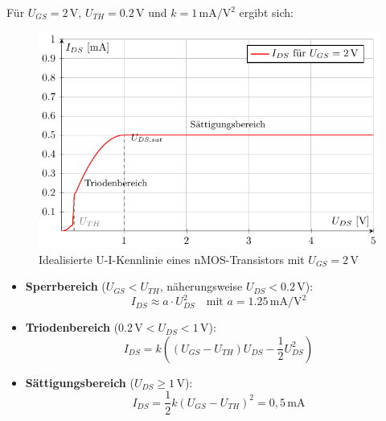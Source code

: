 \documentclass{scrarticle}
\numberwithin{equation}{section}
\begin{document}
Für \( U_{GS} = 2\,\mathrm{V} \), \( U_{TH} = 0.2\,\mathrm{V} \) und \( k = 1\,\mathrm{mA/V^2} \) ergibt sich:
\begin{figure}[h]
	\centering
	\label{fig:kennlinie}
	\includegraphics[scale=1.0]{tkiz/ui-kennlinie.pdf}
	\caption{Idealisierte U-I-Kennlinie eines nMOS-Transistors mit $U_{GS} = 2\,\mathrm{V}$}
\end{figure}
\begin{itemize}
	\item \textbf{Sperrbereich} ($U_{GS} < U_{TH}$, näherungsweise $U_{DS} < 0.2\,\mathrm{V}$): \\
	\[
	I_{DS} \approx a \cdot U_{DS}^2 \quad \text{mit } a = 1.25\,\mathrm{mA/V^2}
	\]
	\item \textbf{Triodenbereich} ($0.2\,\mathrm{V} < U_{DS} < 1\,\mathrm{V}$): \\
	\[
	I_{DS} = k \left((U_{GS} - U_{TH}) U_{DS} - \frac{1}{2} U_{DS}^2\right)
	\]
	\item \textbf{Sättigungsbereich} ($U_{DS} \ge 1\,\mathrm{V}$): \\
	\[
	I_{DS} = \frac{1}{2} k (U_{GS} - U_{TH})^2 = 0{,}5\,\mathrm{mA}
	\]
\end{itemize}
\end{document}
